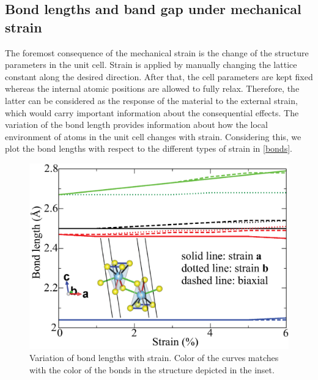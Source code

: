 \subsection{Bond lengths and band gap under mechanical strain}
The foremost consequence of the mechanical strain is the change of the structure parameters in the unit cell. Strain is applied by manually changing the lattice constant along the desired direction. After that, the cell parameters are kept fixed whereas the internal atomic positions are allowed to fully relax. Therefore, the latter can be considered as the response of the material to the external strain, which would carry important information about the consequential effects. The variation of the bond length provides information about how the local environment of atoms in the unit cell changes with strain. Considering this, we plot the bond lengths with respect to the different types of strain in \autoref{bonds}. 

\begin{figure}[htb]
\centering
\includegraphics[width=0.8\linewidth]{Mob_bonds.eps}
\caption{Variation of bond lengths with strain. Color of the curves matches with the color of the bonds in the structure depicted in the inset.\label{bonds}}
\end{figure}


